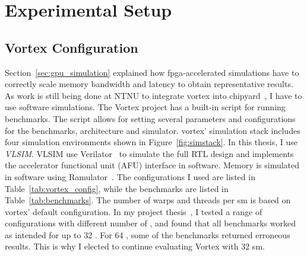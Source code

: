 \chapter{Experimental Setup} \label{chap:exp_setup}

\section{Vortex Configuration}

Section~\ref{sec:gpu_simulation} explained how \acrshort{fpga}-accelerated simulations have to correctly scale memory bandwidth and latency to obtain representative results. As work is still being done at NTNU to integrate \Gls{vortex} into chipyard~\cite{chipyard}, I have to use software simulations. The Vortex project has a built-in script for running benchmarks. The script allows for setting several parameters and configurations for the benchmarks, architecture and simulator. \Gls{vortex}' simulation stack includes four simulation environments shown in Figure~\ref{fig:simstack}. In this thesis, I use \textit{VLSIM}. VLSIM use Verilator~\cite{verilator} to simulate the full RTL design and implements the accelerator functional unit (AFU) interface in software. Memory is simulated in software using Ramulator~\cite{Ramulator}. The configurations I used are listed in Table~\ref{tab:vortex_config}, while the benchmarks are listed in Table~\ref{tab:benchmarks}. The number of warps and threads per \acrshort{sm} is based on \Gls{vortex}' default configuration. In my project thesis~\cite{Aurud_Project}, I tested a range of configurations with different number of , and found that all benchmarks worked as intended for up to 32 . For 64 , some of the benchmarks returned erroneous results. This is why I elected to continue evaluating Vortex with 32 \acrshort{sm}.

